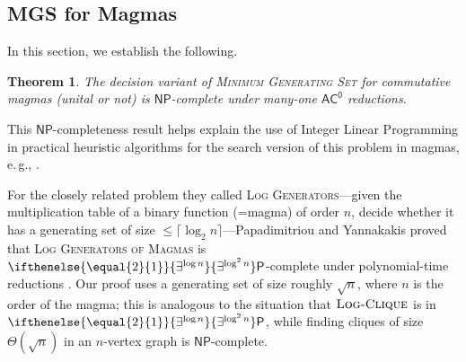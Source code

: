 \documentclass{article}
\newtheorem{theorem}{Theorem}\newtheorem{lemma}[theorem]{Lemma}\newtheorem{proposition}[theorem]{Proposition}\newtheorem{corollary}[theorem]{Corollary}\newtheorem{definition}[theorem]{Definition}\newtheorem{claim}[theorem]{Claim}\newtheorem{remark}[theorem]{Remark}\newtheorem{observation}[theorem]{Observation}\newtheorem{conjecture}[theorem]{Conjecture}\newtheorem{example}[theorem]{Example}
\newcommand{\algprobm}[1]{\textsc{#1}\xspace}
\newcommand{\betacc}[1]{\ifthenelse{\equal{#1}{1}}{\exists^{\log n}}{\exists^{\log^{#1}n}}} %
\newcommand*{\ComplexityClass}[1]{\ensuremath{\mathsf{#1}}\xspace}
\newcommand*{\NP}{\ComplexityClass{NP}}
\renewcommand{\P}{\ComplexityClass{P}}
\newcommand{\ACz}{\ComplexityClass{AC^0}}
\begin{document}
\subsection{MGS for Magmas}

In this section, we establish the following.


\begin{theorem} \label{thm:magma}
    The decision variant of \algprobm{Minimum Generating Set} for commutative magmas (unital or not) is \NP-complete under many-one $\ACz$ reductions.
\end{theorem}



This \NP-completeness result helps explain the use of Integer Linear Programming in practical heuristic algorithms for the search version of this problem in magmas, e.\,g., \cite{JMV}.

For the closely related problem they called \algprobm{Log Generators}---given the multiplication table of a binary function (=magma) of order $n$, decide whether it has a generating set of size $\leq \lceil \log_2 n \rceil$---Papadimitriou and Yannakakis  proved that \algprobm{Log Generators of Magmas} is $\betacc{2} \mathsf{P}$-complete under polynomial-time reductions \cite[Thm.~7]{PY}. 
%
Our proof uses a generating set of size roughly $\sqrt{n}$, where $n$ is the order of the magma; this is analogous to the situation that $\algprobm{Log-Clique}$ is in $\betacc{2} \P$, while finding cliques of size $\Theta(\sqrt{n})$ in an $n$-vertex graph is $\NP$-complete.
\end{document}
